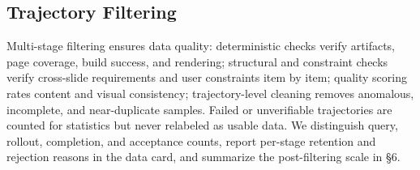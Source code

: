 \subsection{Trajectory Filtering}

Multi-stage filtering ensures data quality: deterministic checks verify artifacts, page coverage, build success, and rendering; structural and constraint checks verify cross-slide requirements and user constraints item by item; quality scoring rates content and visual consistency; trajectory-level cleaning removes anomalous, incomplete, and near-duplicate samples. Failed or unverifiable trajectories are counted for statistics but never relabeled as usable data. We distinguish query, rollout, completion, and acceptance counts, report per-stage retention and rejection reasons in the data card, and summarize the post-filtering scale in §6.
